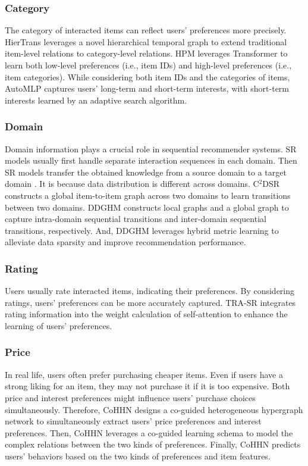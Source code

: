 \documentclass[review]{fcs}
\begin{document}
	\subsubsection{Category}
	The category of interacted items can reflect users' preferences more precisely. HierTrans \cite{HierTrans} leverages a novel hierarchical temporal graph to extend traditional item-level relations to category-level relations. HPM \cite{HPM} leverages Transformer to learn both low-level preferences (i.e., item IDs) and high-level preferences (i.e., item categories). While considering both item IDs and the categories of items, AutoMLP \cite{AutoMLP} captures users’ long-term and short-term interests, with short-term interests learned by an adaptive search algorithm.
	\subsubsection{Domain}
	Domain information plays a crucial role in sequential recommender systems. SR models usually first handle separate interaction sequences in each domain. Then SR models transfer the obtained knowledge from a source domain to a target domain \cite{Tri-CDR, MGCL}. It is because data distribution is different across domains. C$^{2}$DSR \cite{C2DSR} constructs a global item-to-item graph across two domains to learn transitions between two domains. DDGHM \cite{DDGHM} constructs local graphs and a global graph to capture intra-domain sequential transitions and inter-domain sequential transitions, respectively. And, DDGHM leverages hybrid metric learning to alleviate data sparsity and improve recommendation performance.
	\subsubsection{Rating}
	Users usually rate interacted items, indicating their preferences. By considering ratings, users' preferences can be more accurately captured. TRA-SR \cite{TRA-SR} integrates rating information into the weight calculation of self-attention to enhance the learning of users' preferences.
	\subsubsection{Price}
	In real life, users often prefer purchasing cheaper items. Even if users have a strong liking for an item, they may not purchase it if it is too expensive. Both price and interest preferences might influence users' purchase choices simultaneously. Therefore, CoHHN \cite{CoHHN} designs a co-guided heterogeneous hypergraph network to simultaneously extract users' price preferences and interest preferences. Then, CoHHN leverages a co-guided learning schema to model the complex relations between the two kinds of preferences. Finally, CoHHN predicts users' behaviors based on the two kinds of preferences and item features.
\end{document}
